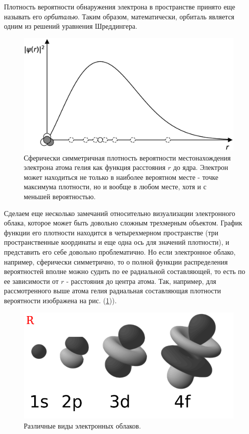 Плотность вероятности обнаружения электрона в пространстве принято еще называть его \textit{орбиталью}.
Таким образом, математически, орбиталь является одним из решений уравнения Шреддингера.

\begin{figure}[t!]
   \centering
   \includegraphics[scale=0.4]{images/radial_prob}
   \caption{Сферически симметричная плотность вероятности местонахождения электрона атома гелия как функция расстояния $r$ до ядра. Электрон может находиться не только в наиболее вероятном месте - точке максимума плотности, но и вообще в любом месте, хотя и с меньшей вероятностью.}
   \label{fig:radial_prob}
\end{figure}

Сделаем еще несколько замечаний относительно визуализации электронного облака, которое может быть довольно сложным трехмерным объектом.
График функции его плотности находится в четырехмерном пространстве (три пространственные координаты и еще одна ось для значений плотности), и представить его себе довольно проблематично.
Но если электронное облако, например, сферически симметрично, то о полной функции распределения вероятностей вполне можно судить по ее радиальной составляющей, то есть по ее зависимости от $r$ - расстояния до центра атома.
Так, например, для рассмотренного выше атома гелия радиальная составляющая плотности вероятности изображена на рис. (\ref{fig:radial_prob})).

\begin{figure}[t!]
   \centering
   \includegraphics[scale=0.9]{images/electron_clouds_1}
   \caption{Различные виды электронных облаков.}
   \label{fig:electron_clouds_1}
\end{figure}

